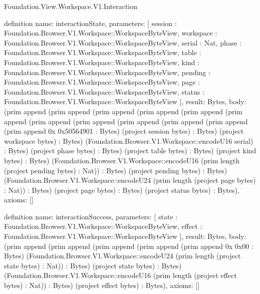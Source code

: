 \begin{lexlean}{Foundation.View.Workspace.V1.Interaction}
\begin{semanticmodule}
definition{
  name: interactionState,
  parameters: [
    session : Foundation.Browser.V1.Workspace::WorkspaceByteView,
    workspace : Foundation.Browser.V1.Workspace::WorkspaceByteView,
    serial : Nat,
    phase : Foundation.Browser.V1.Workspace::WorkspaceByteView,
    table : Foundation.Browser.V1.Workspace::WorkspaceByteView,
    kind : Foundation.Browser.V1.Workspace::WorkspaceByteView,
    pending : Foundation.Browser.V1.Workspace::WorkspaceByteView,
    page : Foundation.Browser.V1.Workspace::WorkspaceByteView,
    status : Foundation.Browser.V1.Workspace::WorkspaceByteView
  ],
  result: Bytes,
  body: (prim append (prim append (prim append (prim append (prim append (prim append (prim append (prim append (prim append (prim append (prim append (prim append 0x 0x50564901 : Bytes) (project session bytes) : Bytes) (project workspace bytes) : Bytes) (Foundation.Browser.V1.Workspace::encodeU16 serial) : Bytes) (project phase bytes) : Bytes) (project table bytes) : Bytes) (project kind bytes) : Bytes) (Foundation.Browser.V1.Workspace::encodeU16 (prim length (project pending bytes) : Nat)) : Bytes) (project pending bytes) : Bytes) (Foundation.Browser.V1.Workspace::encodeU24 (prim length (project page bytes) : Nat)) : Bytes) (project page bytes) : Bytes) (project status bytes) : Bytes),
  axioms: []
}

definition{
  name: interactionSuccess,
  parameters: [
    state : Foundation.Browser.V1.Workspace::WorkspaceByteView,
    effect : Foundation.Browser.V1.Workspace::WorkspaceByteView
  ],
  result: Bytes,
  body: (prim append (prim append (prim append (prim append (prim append 0x 0x00 : Bytes) (Foundation.Browser.V1.Workspace::encodeU24 (prim length (project state bytes) : Nat)) : Bytes) (project state bytes) : Bytes) (Foundation.Browser.V1.Workspace::encodeU16 (prim length (project effect bytes) : Nat)) : Bytes) (project effect bytes) : Bytes),
  axioms: []
}


\end{semanticmodule}
\end{lexlean}
